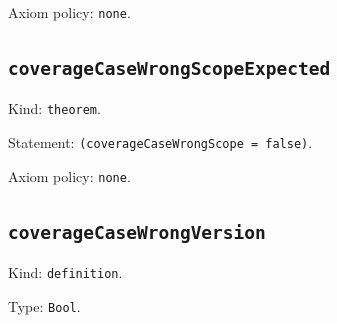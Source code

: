 \documentclass[11pt]{article}
\begin{document}
\noindent Axiom policy: \texttt{none}.\par
\subsection*{\texttt{coverageCaseWrongScopeExpected}}
\noindent Kind: \texttt{theorem}.\par
\noindent Statement: \texttt{(coverageCaseWrongScope = false)}.\par
\noindent Axiom policy: \texttt{none}.\par
\subsection*{\texttt{coverageCaseWrongVersion}}
\noindent Kind: \texttt{definition}.\par
\noindent Type: \texttt{Bool}.\par
\end{document}
